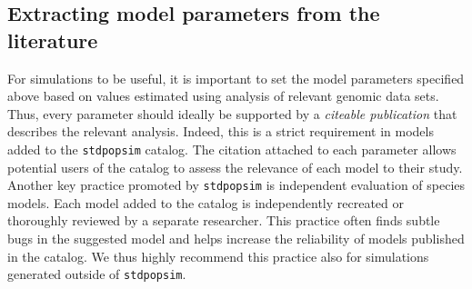\documentclass[hidelinks]{article}
\begin{document}
\subsection*{Extracting model parameters from the literature}
%
%
For simulations to be useful, it is important to set the model parameters specified above based on values estimated using analysis of relevant genomic data sets. Thus, every parameter should ideally be supported by a \emph{citeable publication} that describes the relevant analysis. Indeed, this is a strict requirement in models added to the \texttt{stdpopsim} catalog. The citation attached to each parameter allows potential users of the catalog to assess the relevance of each model to their study. Another key practice promoted by \texttt{stdpopsim} is independent evaluation of species models. Each model added to the catalog is independently recreated or thoroughly reviewed by a separate researcher. This practice often finds subtle bugs in the suggested model and helps increase the reliability of models published in the catalog. We thus highly recommend this practice also for simulations generated outside of \texttt{stdpopsim}.
%

\end{document}
